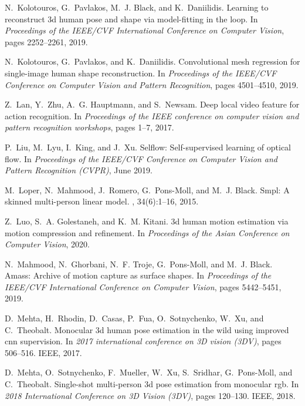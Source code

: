 \documentclass[10pt,twocolumn,letterpaper]{article}
\begin{document}
\begin{thebibliography}{10}
N.~Kolotouros, G.~Pavlakos, M.~J. Black, and K.~Daniilidis.
\newblock Learning to reconstruct 3d human pose and shape via model-fitting in
  the loop.
\newblock In {\em Proceedings of the IEEE/CVF International Conference on
  Computer Vision}, pages 2252--2261, 2019.

N.~Kolotouros, G.~Pavlakos, and K.~Daniilidis.
\newblock Convolutional mesh regression for single-image human shape
  reconstruction.
\newblock In {\em Proceedings of the IEEE/CVF Conference on Computer Vision and
  Pattern Recognition}, pages 4501--4510, 2019.

Z.~Lan, Y.~Zhu, A.~G. Hauptmann, and S.~Newsam.
\newblock Deep local video feature for action recognition.
\newblock In {\em Proceedings of the IEEE conference on computer vision and
  pattern recognition workshops}, pages 1--7, 2017.

P.~Liu, M.~Lyu, I.~King, and J.~Xu.
\newblock Selflow: Self-supervised learning of optical flow.
\newblock In {\em Proceedings of the IEEE/CVF Conference on Computer Vision and
  Pattern Recognition (CVPR)}, June 2019.

M.~Loper, N.~Mahmood, J.~Romero, G.~Pons-Moll, and M.~J. Black.
\newblock Smpl: A skinned multi-person linear model.
, 34(6):1--16, 2015.

Z.~Luo, S.~A. Golestaneh, and K.~M. Kitani.
\newblock 3d human motion estimation via motion compression and refinement.
\newblock In {\em Proceedings of the Asian Conference on Computer Vision},
  2020.

N.~Mahmood, N.~Ghorbani, N.~F. Troje, G.~Pons-Moll, and M.~J. Black.
\newblock Amass: Archive of motion capture as surface shapes.
\newblock In {\em Proceedings of the IEEE/CVF International Conference on
  Computer Vision}, pages 5442--5451, 2019.

D.~Mehta, H.~Rhodin, D.~Casas, P.~Fua, O.~Sotnychenko, W.~Xu, and C.~Theobalt.
\newblock Monocular 3d human pose estimation in the wild using improved cnn
  supervision.
\newblock In {\em 2017 international conference on 3D vision (3DV)}, pages
  506--516. IEEE, 2017.

D.~Mehta, O.~Sotnychenko, F.~Mueller, W.~Xu, S.~Sridhar, G.~Pons-Moll, and
  C.~Theobalt.
\newblock Single-shot multi-person 3d pose estimation from monocular rgb.
\newblock In {\em 2018 International Conference on 3D Vision (3DV)}, pages
  120--130. IEEE, 2018.


\end{thebibliography}
\end{document}
